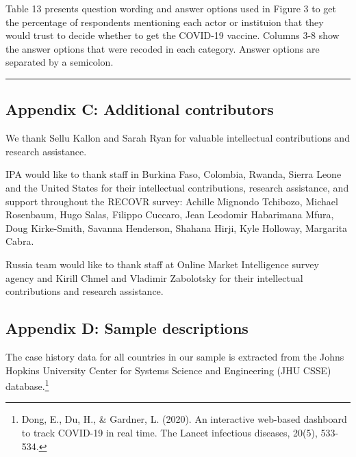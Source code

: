 \documentclass[
  12pt,
]{article}
\begin{document}
\begin{landscape}
\begin{table}[!h]
{\begin{threeparttable}
\begin{tabular}[t]
\bottomrule
\end{tabular}
\begin{tablenotes}
\item Table 13 presents question wording and answer options used in Figure 3 to get the percentage of respondents mentioning each actor or instituion that they would trust to decide whether to get the COVID-19 vaccine. Columns 3-8 show the answer options that were recoded in each category. Answer options are separated by a semicolon.
\end{tablenotes}
\end{threeparttable}}
\end{table}
\end{landscape}

\begin{center}\rule{0.5\linewidth}{0.5pt}\end{center}

\hypertarget{appendix-c-additional-contributors}{%
\subsection*{Appendix C: Additional contributors}\label{appendix-c-additional-contributors}}

We thank Sellu Kallon and Sarah Ryan for valuable intellectual contributions and research assistance.

IPA would like to thank staff in Burkina Faso, Colombia, Rwanda, Sierra Leone and the United States for their intellectual contributions, research assistance, and support throughout the RECOVR survey: Achille Mignondo Tchibozo, Michael Rosenbaum, Hugo Salas, Filippo Cuccaro, Jean Leodomir Habarimana Mfura, Doug Kirke-Smith, Savanna Henderson, Shahana Hirji, Kyle Holloway, Margarita Cabra.

Russia team would like to thank staff at Online Market Intelligence survey agency and Kirill Chmel and Vladimir Zabolotsky for their intellectual contributions and research assistance.

\newpage

\hypertarget{appendixa}{%
\subsection*{Appendix D: Sample descriptions}\label{appendixa}}

The case history data for all countries in our sample is extracted from the Johns Hopkins University Center for Systems Science and Engineering (JHU CSSE) database.\footnote{Dong, E., Du, H., \& Gardner, L. (2020). An interactive web-based dashboard to track COVID-19 in real time. The Lancet infectious diseases, 20(5), 533-534.}
\end{document}

